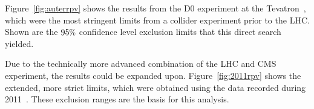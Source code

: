 Figure~\ref{fig:auterrpv} shows the results from the D0 experiment at the Tevatron~\cite{auter,d0rpv}, which were the most stringent limits from a collider experiment prior to the LHC. Shown are the $95\pct$ confidence level exclusion limits that this direct search yielded.

Due to the technically more advanced combination of the LHC and CMS experiment, the results could be expanded upon. Figure~\ref{fig:2011rpv} shows the extended, more strict limits, which were obtained using the data recorded during 2011~\cite{2011rpv}. These exclusion ranges are the basis for this analysis.



